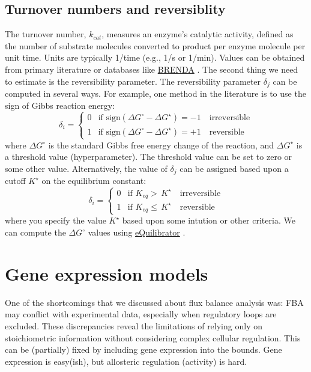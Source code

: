 \documentclass{article}[11pt]
\begin{document}
\subsection{Turnover numbers and reversiblity}
The turnover number, $k_{cat}$, measures an enzyme's catalytic activity, defined as the number of substrate molecules converted to product per enzyme molecule per unit time. Units are typically 1/time (e.g., 1/s or 1/min). 
Values can be obtained from primary literature or databases like \href{https://www.brenda-enzymes.org/}{BRENDA} \citep{BRENDA2021}.
The second thing we need to estimate is the reversibility parameter.
The reversibility parameter $\delta_{j}$ can be computed in several ways. For example, one method in the literature is to use the sign of Gibbs reaction energy:
\begin{equation*}
\delta_{i} = \begin{cases}
0 & \text{if }\text{sign}\left(\Delta{G}^{\circ} - \Delta{G}^{\star}\right)= -1 \quad\text{irreversible} \\
1 & \text{if }\text{sign}\left(\Delta{G}^{\circ} - \Delta{G}^{\star}\right)= +1 \quad\text{reversible}
\end{cases}
\end{equation*}
where $\Delta{G}^{\circ}$ is the standard Gibbs free energy change of the reaction, and $\Delta{G}^{\star}$ is a threshold value (hyperparameter). 
The threshold value can be set to zero or some other value. Alternatively, the value of $\delta_{j}$ can be assigned based upon a cutoff $K^{\star}$ on the equilibrium constant:
\begin{equation*}
\delta_{i} = \begin{cases}
0 & \text{if }K_{eq}>\,K^{\star}\quad\text{irreversible} \\
1 & \text{if }K_{eq}\leq\,K^{\star}\quad\text{reversible}
\end{cases}
\end{equation*}
where you specify the value $K^{\star}$ based upon some intution or other criteria. We can compute the $\Delta{G}^{\circ}$ values using \href{ttps://equilibrator.weizmann.ac.il}{eQuilibrator} \citep{Beber:2022aa}.

\section{Gene expression models}
One of the shortcomings that we discussed about flux balance analysis was: 
FBA may conflict with experimental data, especially when regulatory loops are excluded. 
These discrepancies reveal the limitations of relying only on stoichiometric information without considering complex cellular regulation. 
This can be (partially) fixed by including gene expression into the bounds.
Gene expression is easy(ish), but allosteric regulation (activity) is hard.
\end{document}
